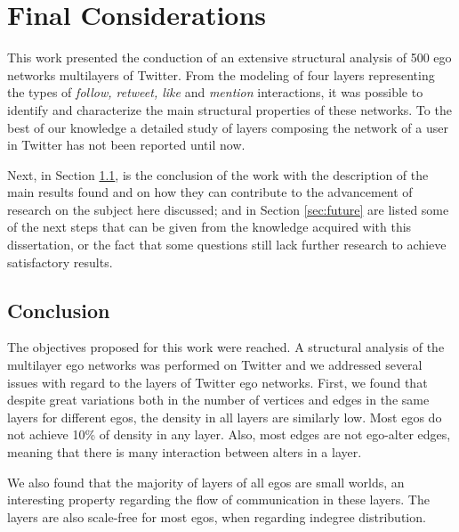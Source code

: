 \chapter{Final Considerations}
\label{cap:Considerations}

This work presented the conduction of an extensive structural analysis of 500 ego networks multilayers of Twitter. From the modeling of four layers representing the types of {\em follow, retweet, like} and {\em mention} interactions, it was possible to identify and characterize the main structural properties of these networks. To the best of our knowledge a detailed study of layers composing the network of a user in Twitter has not been reported until now. 

Next, in Section \ref{sec:conclusion}, is the conclusion of the work with the description of the main results found and on how they can contribute to the advancement of research on the subject here discussed; and in Section \ref{sec:future} are listed some of the next steps that can be given from the knowledge acquired with this dissertation, or the fact that some questions still lack further research to achieve satisfactory results.




\section{Conclusion}
\label{sec:conclusion}

The objectives proposed for this work were reached. A structural analysis of the multilayer ego networks was performed on Twitter and we addressed several issues with regard to the layers of Twitter ego networks. First,  we found that despite  great variations both in the number of vertices and edges in the same layers for different egos, the density in all layers are similarly low. Most  egos do not achieve 10\% of density in any layer. Also, most edges are not ego-alter edges,  meaning that there is many interaction between alters in a layer.

 

We also found that the majority of layers of all egos are small worlds, an interesting property regarding the flow of communication in these layers. The layers are also scale-free for most egos, when regarding indegree distribution. 
 
